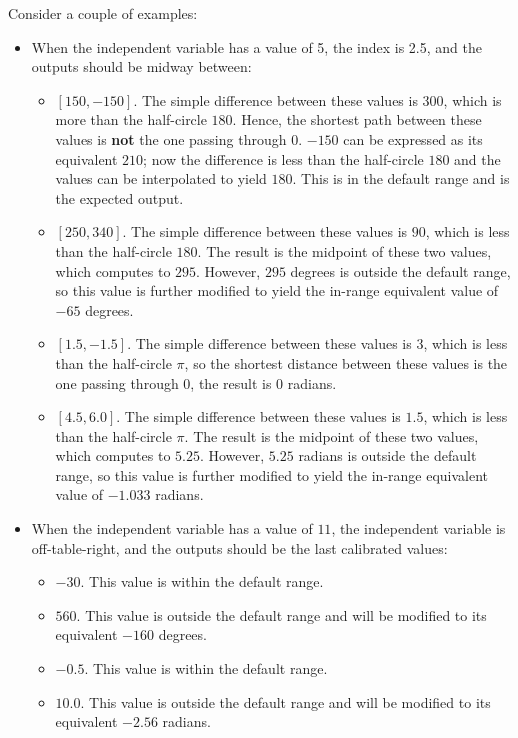 \documentclass[11pt,fleqn]{report}
\begin{document}
Consider a couple of examples:
\begin{itemize}
  \item When the independent variable has a value of 5, the index is 2.5,
  and the
  outputs should be midway between:
  \begin{itemize}
    \item $[150,-150]$.  The simple difference between these values is $300$,
    which is more than the half-circle $180$.  Hence, the shortest path
    between these values is
    \textbf{not} the one passing through $0$.  $-150$ can be expressed as its
    equivalent
    $210$; now the difference is less than the half-circle $180$ and the
    values can be
    interpolated to yield $180$.  This is in the default range and is the
    expected output.
    \item $[250,340]$.  The simple difference between these values is $90$,
    which is less
    than the half-circle $180$.  The result is the midpoint of these two
    values, which
    computes to $295$.  However, $295$ degrees is outside the default range,
    so this value is further modified to yield the in-range equivalent value
    of $-65$ degrees.
    \item $[1.5,-1.5]$.  The simple difference between these values is $3$,
    which is less
    than the half-circle $\pi$, so the shortest distance between these values
    is the one
    passing through $0$, the result is $0$ radians.
    \item $[4.5, 6.0]$.   The simple difference between these values is $1.5$,
    which is less
    than the half-circle $\pi$.  The result is the midpoint of these two
    values, which
    computes to $5.25$.  However, $5.25$ radians is outside the default
    range, so this value
    is further modified to yield the in-range equivalent value of $-1.033$
    radians.
  \end{itemize}
  \item When the independent variable has a value of $11$, the independent
  variable is
  off-table-right, and the outputs should be the last calibrated values:
  \begin{itemize}
    \item $-30$.  This value is within the default range.
    \item $560$.  This value is outside the default range and will be
    modified to its
    equivalent $-160$ degrees.
    \item $-0.5$.  This value is within the default range.
    \item $10.0$.  This value is outside the default range and will be
    modified to its
    equivalent $-2.56$ radians.
  \end{itemize}
\end{itemize}
\end{document}
